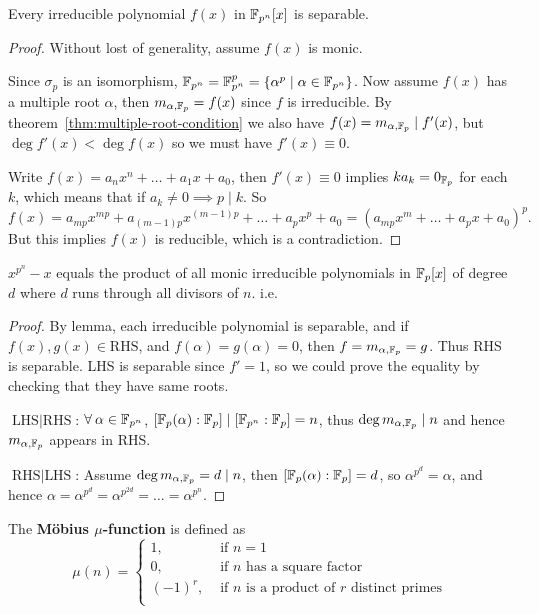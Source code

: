 \begin{lemma}
  Every irreducible polynomial $f(x)$ in $\mathbb{F}_{p^n}[x]$ is separable.

  \begin{proof}
    Without lost of generality, assume $f(x)$ is monic.

    Since $\sigma_p$ is an isomorphism, $\mathbb{F}_{p^n} = \mathbb{F}_{p^n}^p = \{ \alpha^p \mid \alpha \in \mathbb{F}_{p^n}\}$.
    Now assume $f(x)$ has a multiple root $\alpha$, then $m_{\alpha, \mathbb{F}_p} = f(x)$ since $f$
    is irreducible. By theorem~\ref{thm:multiple-root-condition} we also have
    $f(x) = m_{\alpha, \mathbb{F}_p} \mid f'(x)$, but $\deg f'(x) < \deg f(x)$ so we must have $f'(x) \equiv 0$.

    Write $f(x) = a_n x^n + \ldots + a_1 x + a_0$, then $f'(x) \equiv 0$ implies $k a_k = 0_{\mathbb{F}_p}$ for each $k$,
    which means that if $a_k \neq 0 \implies p \mid k$. So
    \[ f(x) = a_{mp} x^{mp} + a_{(m-1)p} x^{(m-1)p} + \dots + a_p x^p + a_0 =
    (a_{mp} x^m + \ldots + a_p x + a_0)^p. \]
    But this implies $f(x)$ is reducible, which is a contradiction.
  \end{proof}
\end{lemma}

\begin{theorem}
  $x^{p^n} - x$ equals the product of all monic irreducible polynomials in
  $\mathbb{F}_p[x]$ of degree $d$ where $d$ runs through all divisors of $n$. i.e.

  \begin{proof}
    By lemma, each irreducible polynomial is separable, and if $f(x), g(x) \in \text{RHS}$,
    and $f(\alpha) = g(\alpha) = 0$, then $f = m_{\alpha, \mathbb{F}_p} = g$. Thus RHS is separable.
    LHS is separable since $f' = 1$, so we could prove the equality by checking that
    they have same roots.

    $\text{LHS} \mid \text{RHS}$: $\forall \alpha \in \Fb_{p^n}$,
    $[\mathbb{F}_p(\alpha): \mathbb{F}_p] \mid [\mathbb{F}_{p^n}: \mathbb{F}_p] = n$, thus $\deg m_{\alpha, \mathbb{F}_p} \mid n$
    and hence $m_{\alpha, \mathbb{F}_p}$ appears in RHS.

    $\text{RHS} \mid \text{LHS}$: Assume $\deg m_{\alpha, \mathbb{F}_p} = d \mid n$, then
    $[\mathbb{F}_p(\alpha): \mathbb{F}_p] = d$, so $\alpha^{p^d} = \alpha$, and hence
    $\alpha = \alpha^{p^d} = \alpha^{p^{2d}} = \dots = \alpha^{p^n}$.
  \end{proof}
\end{theorem}

\begin{definition}
  The {\bf M\"{o}bius $\mu$-function} 
  is defined as
  \[ \mu(n) =
    \begin{cases}
      1, & \text{ if } n = 1 \\
      0, & \text{ if } n \text{ has a square factor } \\
      (-1)^r, & \text{ if } n \text{ is a product of $r$ distinct primes} \\
    \end{cases}
  \]
\end{definition}


